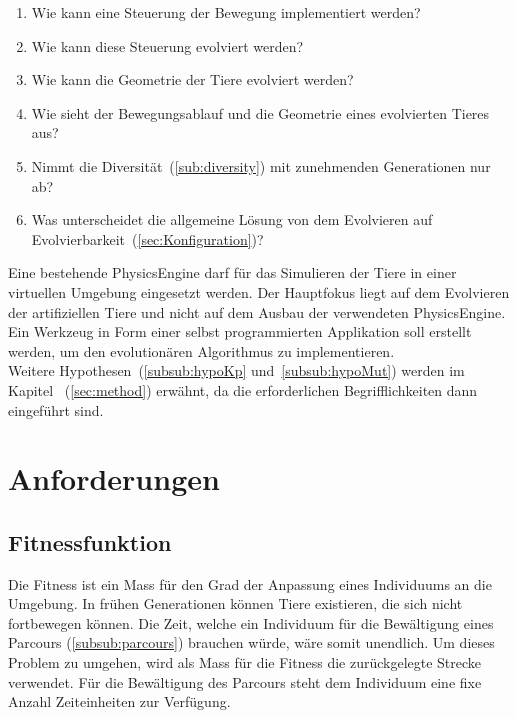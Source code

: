     \begin{enumerate}
      \item Wie kann eine Steuerung der Bewegung implementiert werden?\label{item:frageSteuerungBeine}
      \item Wie kann diese Steuerung evolviert werden?
      \item Wie kann die Geometrie der Tiere evolviert werden?
      \item Wie sieht der Bewegungsablauf und die Geometrie eines evolvierten Tieres aus?
      \item Nimmt die Diversität~(\vref{sub:diversity}) mit zunehmenden Generationen nur ab?
      \item Was unterscheidet die allgemeine Lösung von dem Evolvieren auf Evolvierbarkeit~(\vref{sec:Konfiguration})?
    \end{enumerate}

    Eine bestehende \gls{PhysicsEngine} darf für das Simulieren der Tiere in einer virtuellen Umgebung eingesetzt werden.
    Der Hauptfokus liegt auf dem Evolvieren der artifiziellen Tiere und
    nicht auf dem Ausbau der verwendeten \gls{PhysicsEngine}.
    Ein Werkzeug in Form einer selbst programmierten Applikation soll erstellt werden,
    um den evolutionären Algorithmus zu implementieren.
    \\
    Weitere Hypothesen~(\vref{subsub:hypoKp} und~\vref{subsub:hypoMut})
    werden im Kapitel ~(\vref{sec:method}) erwähnt,
    da die erforderlichen Begrifflichkeiten dann eingeführt sind.

  \section{Anforderungen}

    \subsection{Fitnessfunktion}

      Die Fitness ist ein Mass für den Grad der Anpassung eines Individuums an die Umgebung.
      In frühen Generationen können Tiere existieren, die sich nicht fortbewegen können.
      Die Zeit, welche ein Individuum für die Bewältigung eines Parcours (\vref{subsub:parcours}) brauchen würde,
      wäre somit unendlich.
      Um dieses Problem zu umgehen, wird als Mass für die Fitness die zurückgelegte Strecke verwendet.
      Für die Bewältigung des Parcours steht dem Individuum eine fixe Anzahl Zeiteinheiten zur Verfügung.

